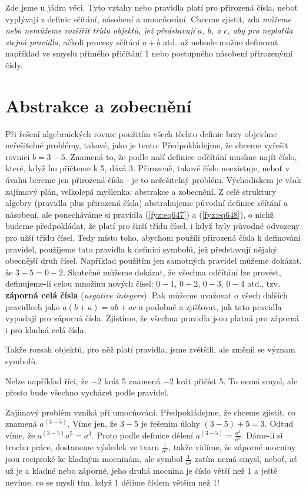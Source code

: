     Zde jsme u jádra věci. Tyto vztahy nebo pravidla platí pro přirozená čísla, neboť vyplývají z
    deﬁnic sčítání, násobení a umocňování. Chceme zjistit, zda \emph{můžeme nebo nemůžeme rozšířit
    třídu objektů, jež představují \(a\), \(b\), a \(c\), aby pro neplatila stejná pravidla}, ačkoli
    procesy sčítání \(a + b\) atd. už nebude možno deﬁnovat například ve smyslu přímého přičítání 1
    nebo postupného násobení přirozenými čísly.
  
  \section{Abstrakce a zobecnění}\label{fyz:IchapXXIIsecIII}
    Při řešení algebraických rovnic použitím všech těchto deﬁnic brzy objevíme neřešitelné problémy,
    takové, jako je tento: Předpokládejme, že chceme vyřešit rovnici \(b= 3-5\). Znamená to, že
    podle naší deﬁnice odčítání musíme najít číslo, které, když ho přičteme k \num{5}, dává \num{3}.
    Přirozeně, takové číslo neexistuje, neboť v úvahu bereme jen přirozená čísla - je to neřešitelný
    problém. Východiskem je však zajímavý plán, velkolepá myšlenka: abstrakce a zobecnění. Z celé
    struktury algebry (pravidla plus přirozená čísla) abstrahujeme původní definice sčítání a
    násobení, ale ponecháváme si pravidla (\ref{fyz:eq647}) a (\ref{fyz:eq648}), o nichž budeme
    předpokládat, že platí pro širší třídu čísel, i když byly původně odvozeny pro užší třídu čísel.
    Tedy místo toho, abychom použili přirozená čísla k deﬁnování pravidel, použijeme tato pravidla k
    deﬁnici symbolů, jež představují nějaký obecnější druh čísel. Například použitím jen samotných
    pravidel můžeme dokázat, že \(3-5=0-2\). Skutečně můžeme dokázat, že všechna odčítání lze
    provést, deﬁnujeme-li celou množinu nových čísel: \(0-1\), \(0-2\), \(0-3\), \(0-4\) atd., tzv.
    \textbf{záporná celá čísla} (\emph{negative integers}). Pak můžeme uvažovat o všech dalších
    pravidlech jako \(a(b+a)=ab+ac\) a podobně a zjišťovat, jak tato pravidla vypadají pro záporná
    čísla. Zjistíme, že všechna pravidla jsou platná pro záporná i pro kladná celá čísla.
    
    Takže rozsah objektů, pro něž platí pravidla, jsme zvětšili, ale změnil se význam symbolů.

    Nelze například říci, že \num{-2} krát \num{5} znamená \num{-2} krát přičíst \num{5}. To nemá
    smysl, ale přesto bude všechno vycházet podle pravidel.

    Zajímavý problém vzniká při umocňování. Předpokládejme, že chceme zjistit, co znamená
    \(a^{(3-5)}\). Víme jen, že \(3-5\) je řešením úlohy \((3-5)+5=3\). Odtud víme, že
    \(a^{(3-5)}a^5 = a^3\). Proto podle deﬁnice dělení \(a^{(3-5)} = \frac{a^3}{a^5}\). Dáme-li si
    trochu práce, dostaneme výsledek ve tvaru \(\frac{1}{a^2}\), takže vidíme, že záporné mocniny
    jsou reciproké ke kladným mocninám, ale symbol \(\frac{1}{a^2}\) zatím nemá smysl, neboť, ať už
    je a kladné nebo záporné, jeho druhá mocnina je číslo větší než \num{1} a ještě nevíme, co se
    myslí tím, když 1 dělíme číslem větším než \num{1}!

